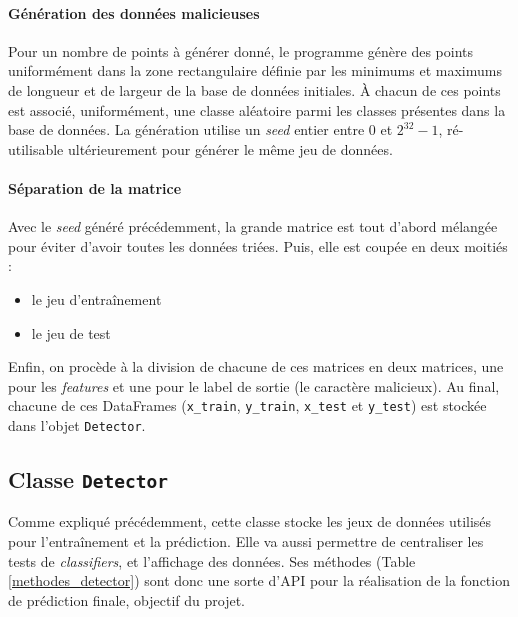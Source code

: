 \documentclass[a4paper]{report}
\begin{document}
\paragraph{Génération des données malicieuses} Pour un nombre de points à générer donné, le programme génère des points uniformément dans la zone rectangulaire définie par les minimums et maximums de longueur et de largeur de la base de données initiales. À chacun de ces points est associé, uniformément, une classe aléatoire parmi les classes présentes dans la base de données. La génération utilise un \emph{seed} entier entre 0 et $2^{32}-1$, ré-utilisable ultérieurement pour générer le même jeu de données.

\paragraph{Séparation de la matrice} Avec le \emph{seed} généré précédemment, la grande matrice est tout d'abord mélangée pour éviter d'avoir toutes les données triées. Puis, elle est coupée en deux moitiés :
\begin{itemize}
\item le jeu d'entraînement
\item le jeu de test
\end{itemize}
Enfin, on procède à la division de chacune de ces matrices en deux matrices, une pour les \emph{features} et une pour le label de sortie (le caractère malicieux). Au final, chacune de ces DataFrames (\texttt{x\_train}, \texttt{y\_train}, \texttt{x\_test} et \texttt{y\_test}) est stockée dans l'objet \texttt{Detector}.

\subsection{Classe \texttt{Detector}}

Comme expliqué précédemment, cette classe stocke les jeux de données utilisés pour l'entraînement et la prédiction. Elle va aussi permettre de centraliser les tests de \emph{classifiers}, et l'affichage des données. Ses méthodes (Table \ref{methodes_detector}) sont donc une sorte d'API pour la réalisation de la fonction de prédiction finale, objectif du projet.
\end{document}
